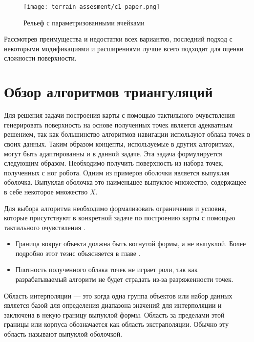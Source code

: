 \begin{enumerate}
          \begin{figure}[H]
              \centering\texttt{[image: terrain\_assesment/c1\_paper.png]}
              \caption{Рельеф с параметризованными ячейками}
              \label{fig:terrain_assesment/c1_paper.png}
          \end{figure}
\end{enumerate}

Рассмотрев преимущества и недостатки всех вариантов, последний подход с некоторыми модификациями и расширениями лучше всего подходит для оценки сложности поверхности.

\section{Обзор алгоритмов триангуляций}
Для решения задачи построения карты с помощью тактильного очувствления генерировать поверхность на основе полученных точек является адекватным решением, так как большинство алгоритмов навигации используют облака точек в своих данных. Таким образом концепты, используемые в других алгоритмах, могут быть адаптированны и в данной задаче. Эта задача формулируется следующим образом. Необходимо получить поверхность из набора точек, полученных с ног робота. Одним из примеров оболочки является выпуклая оболочка. Выпуклая оболочка это наименьшее выпуклое множество, содержащее в себе некоторое множество $X$.

Для выбора алгоритма необходимо формализовать ограничения и условия, которые присутствуют в конкретной задаче по построению карты с помощью тактильного очувствления \cite{ebertInterpolationExtrapolationComparison2014,kumarSurfaceTriangulationSurvey,aurenhammerVoronoiDiagramsSurvey1991}.
\begin{itemize}
    \item Граница вокруг объекта должна быть вогнутой формы, а не выпуклой. Более подробно этот тезис объясняется в главе .
    \item Плотность полученного облака точек не играет роли, так как разрабатываемый алгоритм не будет страдать из-за разряженности точек.
\end{itemize}

Область интерполяции \cite{brooksCharacterizingDomainRegression1988,patelLinearProgramDetect1995,baranyiEffectsParameterizationPerformance1996,haffnerEscapingConvexHull2001,kingDangersExtremeCounterfactuals2006} --- это когда одна группа объектов или набор данных является базой для определения диапазона значений для интерполяции и заключена в некую границу выпуклой формы. Область за пределами этой границы или корпуса обозначается как область экстраполяции. Обычно эту область называют выпуклой оболочкой.

